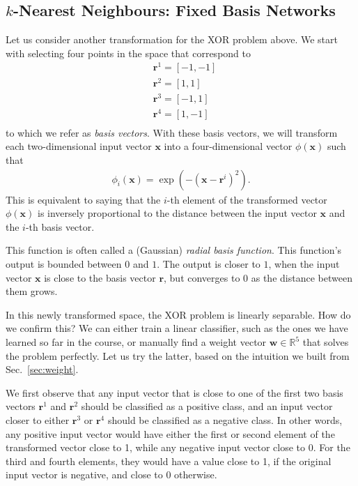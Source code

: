 \documentclass{report}
\newcommand{\vect}[1]{\mathbf{#1}}
\newcommand{\vx}[0]{\vect{x}}
\newcommand{\vw}[0]{\vect{w}}
\newcommand{\vr}[0]{\vect{r}}
\newcommand{\RR}[0]{\mathbb{R}}
\begin{document}
\subsection{$k$-Nearest Neighbours: Fixed Basis Networks}

Let us consider another transformation for the XOR problem above. We start with
selecting four points in the space that correspond to 
\begin{align*}
    &\vr^1 = [-1, -1] \\
    &\vr^2 = [1, 1] \\
    &\vr^3 = [-1, 1] \\
    &\vr^4 = [1, -1] \\
\end{align*}
to which we refer as {\it basis vectors}. With these basis vectors, we will
transform each two-dimensional input vector $\vx$ into a four-dimensional vector
$\phi(\vx)$ such that
\begin{align}
    \label{eq:rbf}
    \phi_i(\vx) = \exp\left( -(\vx - \vr^i)^2 \right).
\end{align}
This is equivalent to saying that the $i$-th element of the transformed vector
$\phi(\vx)$ is inversely proportional to the distance between the input vector
$\vx$ and the $i$-th basis vector. 

This function is often called a (Gaussian) {\it radial basis function}. This
function's output is bounded between $0$ and $1$. The output is closer to $1$,
when the input vector $\vx$ is close to the basis vector $\vr$, but converges to
$0$ as the distance between them grows. 

In this newly transformed space, the XOR problem is linearly separable. How do
we confirm this? We can either train a linear classifier, such as the ones we
have learned so far in the course, or manually find a weight vector $\vw \in
\RR^5$ that solves the problem perfectly. Let us try the latter, based on the
intuition we built from Sec.~\ref{sec:weight}.

We first observe that any input vector that is close to one of the first two
basis vectors $\vr^1$ and $\vr^2$ should be classified as a positive class, and
an input vector closer to either $\vr^3$ or $\vr^4$ should be classified as a
negative class. In other words, any positive input vector would have either the
first or second element of the transformed vector close to 1, while any negative
input vector close to 0. For the third and fourth elements, they would have a
value close to 1, if the original input vector is negative, and close to 0
otherwise. 
\end{document}
